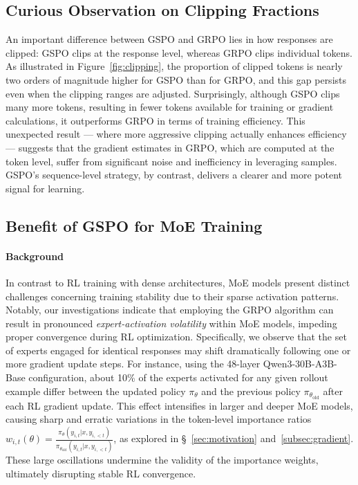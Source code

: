 \subsection{Curious Observation on Clipping Fractions}

An important difference between GSPO and GRPO lies in how responses are clipped: GSPO clips at the response level, whereas GRPO clips individual tokens. As illustrated in Figure~\ref{fig:clipping}, the proportion of clipped tokens is nearly two orders of magnitude higher for GSPO than for GRPO, and this gap persists even when the clipping ranges are adjusted. Surprisingly, although GSPO clips many more tokens, resulting in fewer tokens available for training or gradient calculations, it outperforms GRPO in terms of training efficiency. This unexpected result — where more aggressive clipping actually enhances efficiency — suggests that the gradient estimates in GRPO, which are computed at the token level, suffer from significant noise and inefficiency in leveraging samples. GSPO’s sequence-level strategy, by contrast, delivers a clearer and more potent signal for learning.

\subsection{Benefit of GSPO for MoE Training}
\label{subsec:routing_replay}

\paragraph{Background}
In contrast to RL training with dense architectures, MoE models present distinct challenges concerning training stability due to their sparse activation patterns. Notably, our investigations indicate that employing the GRPO algorithm can result in pronounced \textit{expert-activation volatility} within MoE models, impeding proper convergence during RL optimization. Specifically, we observe that the set of experts engaged for identical responses may shift dramatically following one or more gradient update steps. For instance, using the 48-layer Qwen3-30B-A3B-Base configuration, about 10\% of the experts activated for any given rollout example differ between the updated policy $\pi_{\theta}$ and the previous policy $\pi_{\theta_\text{old}}$ after each RL gradient update. This effect intensifies in larger and deeper MoE models, causing sharp and erratic variations in the token-level importance ratios $w_{i,t}(\theta) = \frac{ \pi_{\theta} (y_{i,t} | x, y_{i,<t}) }{ \pi_{\theta_\text{old}} (y_{i,t} | x,y_{i,<t})}$, as explored in \S~\ref{sec:motivation} and~\ref{subsec:gradient}. These large oscillations undermine the validity of the importance weights, ultimately disrupting stable RL convergence.

